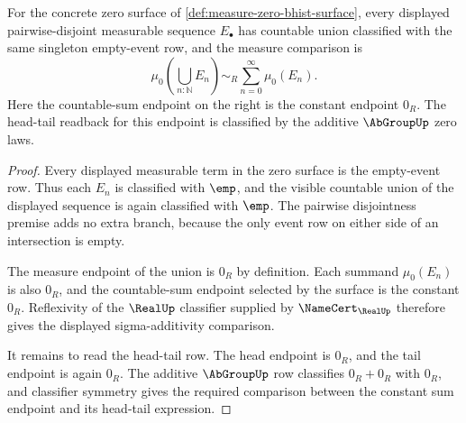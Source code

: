 \begin{theorem}
\label{thm:measure-zero-bhist-sigma-additivity}
For the concrete zero surface of
\autoref{def:measure-zero-bhist-surface}, every displayed pairwise-disjoint
measurable sequence $E_\bullet$ has countable union classified with the same
singleton empty-event row, and the measure comparison is
$$
\mu_0\left(\bigcup_{n:\mathbb{N}}E_n\right)\sim_R
\sum_{n=0}^{\infty}\mu_0(E_n).
$$
Here the countable-sum endpoint on the right is the constant endpoint $0_R$.
The head-tail readback for this endpoint is classified by the additive
$\AbGroupUp$ zero laws.
\end{theorem}
\begin{proof}
Every displayed measurable term in the zero surface is the empty-event row.
Thus each $E_n$ is classified with $\emp$, and the visible countable union of
the displayed sequence is again classified with $\emp$. The pairwise
disjointness premise adds no extra branch, because the only event row on either
side of an intersection is empty.

The measure endpoint of the union is $0_R$ by definition. Each summand
$\mu_0(E_n)$ is also $0_R$, and the countable-sum endpoint selected by the
surface is the constant $0_R$. Reflexivity of the $\RealUp$ classifier supplied
by $\NameCert_{\RealUp}$ therefore gives the displayed sigma-additivity
comparison.

It remains to read the head-tail row. The head endpoint is $0_R$, and the tail
endpoint is again $0_R$. The additive $\AbGroupUp$ row classifies
$0_R+0_R$ with $0_R$, and classifier symmetry gives the required comparison
between the constant sum endpoint and its head-tail expression.
\end{proof}

